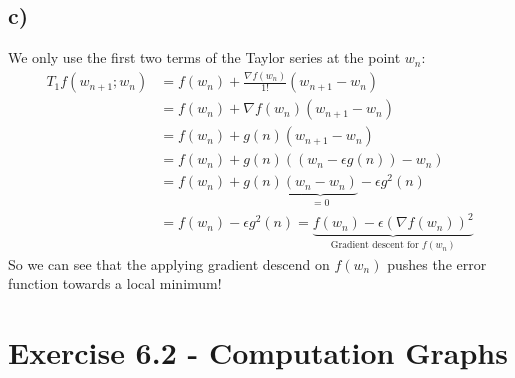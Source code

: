 \documentclass[a4paper]{article}
\begin{document}
    \subsection*{c)}
        We only use the first two terms of the Taylor series at the point $w_n$:
        \begin{align*}
            T_1 f(w_{n+1};w_n) &= f(w_n) + \frac{\nabla f(w_n)}{1!} (w_{n+1} - w_n)\\
            &= f(w_n) + \nabla f(w_n) (w_{n+1} - w_n)\\
            &= f(w_n) + g(n) (w_{n+1} - w_n)\\
            &= f(w_n) + g(n) ((w_n - \epsilon g(n)) - w_n)\\
            &= f(w_n) + g(n) \underbrace{(w_n - w_n)}_{=0} - \epsilon g^2(n)\\
            &= f(w_n) - \epsilon g^2(n) 
            = \underbrace{f(w_n) - \epsilon (\nabla f(w_n))^2}_{\text{Gradient descent for } f(w_n)}
        \end{align*}
        So we can see that the applying gradient descend on $f(w_n)$ pushes the error function towards a local minimum!




\newpage
\section*{Exercise 6.2 - Computation Graphs}
\end{document}
